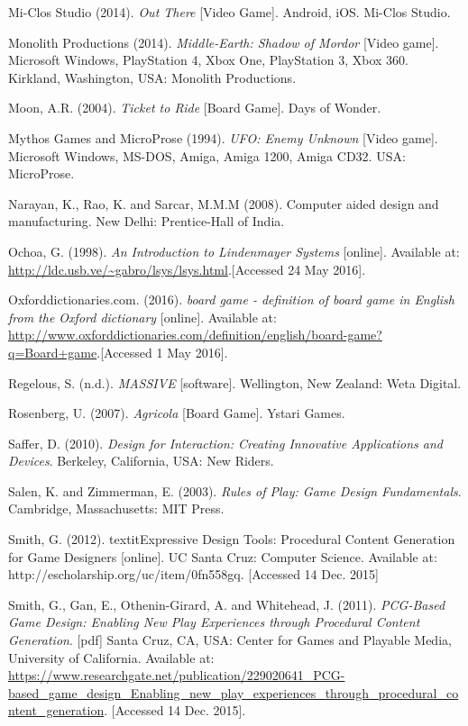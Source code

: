 \documentclass[a4paper,11pt]{report}
\begin{document}
\begin{thebibliography}{1}
Mi-Clos Studio (2014). \textit{Out There} [Video Game]. Android, iOS. Mi-Clos Studio.

Monolith Productions (2014). \textit{Middle-Earth: Shadow of Mordor} [Video game]. Microsoft Windows, PlayStation 4, Xbox One, PlayStation 3, Xbox 360. Kirkland, Washington, USA: Monolith Productions.

Moon, A.R. (2004). \textit{Ticket to Ride} [Board Game]. Days of Wonder.

Mythos Games and MicroProse (1994). \textit{UFO: Enemy Unknown} [Video game]. Microsoft Windows, MS-DOS, Amiga, Amiga 1200, Amiga CD32. USA: MicroProse.

Narayan, K., Rao, K. and Sarcar, M.M.M (2008). Computer aided design and manufacturing. New Delhi: Prentice-Hall of India.

Ochoa, G. (1998). \textit{An Introduction to Lindenmayer Systems} [online]. Available at:  \url{http://ldc.usb.ve/~gabro/lsys/lsys.html}.[Accessed 24 May 2016].

Oxforddictionaries.com. (2016). \textit{board game - definition of board game in English from the Oxford dictionary} [online]. Available at:  \url{http://www.oxforddictionaries.com/definition/english/board-game?q=Board+game}.[Accessed 1 May 2016].

Regelous, S. (n.d.). \textit{MASSIVE} [software]. Wellington, New Zealand: Weta Digital.

Rosenberg, U. (2007). \textit{Agricola} [Board Game]. Ystari Games.

Saffer, D. (2010). \textit{Design for Interaction: Creating Innovative Applications and Devices}. Berkeley, California, USA: New Riders.

Salen, K. and Zimmerman, E. (2003). \textit{Rules of Play: Game Design Fundamentals}. Cambridge, Massachusetts: MIT Press.

Smith, G. (2012). textit{Expressive Design Tools: Procedural Content Generation for Game Designers} [online]. UC Santa Cruz: Computer Science. Available at: http://escholarship.org/uc/item/0fn558gq. [Accessed 14 Dec. 2015]

Smith, G., Gan, E., Othenin-Girard, A. and Whitehead, J. (2011). \textit{PCG-Based Game Design: Enabling New Play Experiences through Procedural Content Generation}. [pdf] Santa Cruz, CA, USA: Center for Games and Playable Media, University of California. Available at: \url{https://www.researchgate.net/publication/229020641_PCG-based_game_design_Enabling_new_play_experiences_through_procedural_content_generation}. [Accessed 14 Dec. 2015].


\end{thebibliography}
\end{document}
